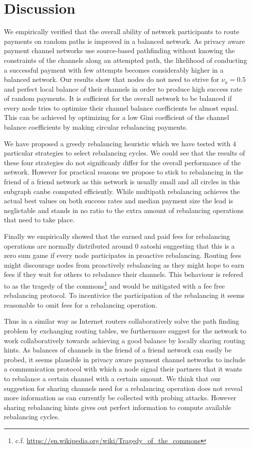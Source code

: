 \documentclass[a4paper]{paper}
\begin{document}
\section{Discussion}
\label{sec:conclusion}
We empirically verified that the overall ability of network participants to route payments on random paths is improved in a balanced network. 
As privacy aware payment channel networks use source-based pathfinding without knowing the constraints of the channels along an attempted path, the likelihood of conducting a successful payment with few attempts becomes considerably higher in a balanced network.
Our results show that nodes do not need to strive for $\nu_u = 0.5$ and perfect local balance of their channels in order to produce high success rate of random payments.
It is sufficient for the overall network to be balanced if every node tries to optimize their channel balance coefficients be almost equal. 
This can be achieved by optimizing for a low Gini coefficient of the channel balance coefficients by making circular rebalancing payments.

We have proposed a greedy rebalancing heuristic which we have tested with $4$ particular strategies to select rebalancing cycles.
We could see that the results of these four strategies do not significanly differ for the overall performance of the network.
However for practical reasons we propose to stick to rebalancing in the friend of a friend network as this network is usually small and all circles in this subgraph canbe computed efficiently.
While multipath rebalancing achieves the actual best values on both success rates and median payment size the lead is neglictable and stands in no ratio to the extra amount of rebalancing operations that need to take place.

Finally we empirically showed that the earned and paid fees for rebalancing operations are normally distributed around 0 satoshi suggesting that this is a zero sum game if every node participates in proactive rebalancing.
Routing fees might discourage nodes from proactively rebalancing as they might hope to earn fees if they wait for others to rebalance their channels.
This behaviour is refered to as the tragedy of the commons\footnote{c.f. \url{https://en.wikipedia.org/wiki/Tragedy_of_the_commons}} and would be mitigated with a fee free rebalancing protocol.
To incentivice the participation of the rebalancing it seems reasonable to omit fees for a rebalancing operation.

Thus in a similar way as Internet routers collaboratively solve the path finding problem by exchanging routing tables, we furthermore suggest for the network to work collaboratively towards achieving a good balance by locally sharing routing hints. 
As balances of channels in the friend of a friend network can easily be probed, it seems plausible in privacy aware payment channel networks to include a communication protocol with which a node signal their partners that it wants to rebalance a certain channel with a certain amount.
We think that our suggestion for sharing channels need for a rebalancing operation does not reveal more information as can currently be collected with probing attacks.
However sharing rebalancing hints gives out perfect information to compute available rebalancing cycles.
\end{document}
